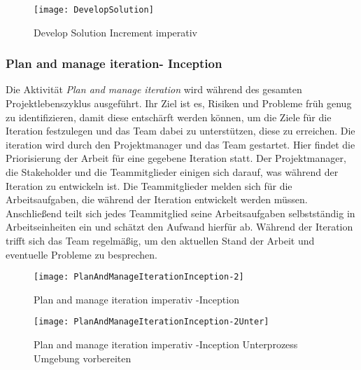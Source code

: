  
\begin{figure}[htp]
\begin{center}
  \texttt{[image: DevelopSolution]} %
  \caption{Develop Solution Increment imperativ}
  \label{fig:Develop}
\end{center}
\end{figure}

\subsubsection{Plan and manage iteration- Inception}

Die Aktivität \textit{Plan and manage iteration} wird während des gesamten Projektlebenszyklus ausgeführt. Ihr Ziel ist es, Risiken und Probleme früh genug zu identifizieren, damit diese entschärft werden können, um die Ziele für die Iteration festzulegen und das Team dabei zu unterstützen, diese zu erreichen.\newline
Die iteration wird durch den Projektmanager und das Team gestartet. Hier findet die Priorisierung der Arbeit für eine gegebene Iteration statt. Der Projektmanager, die Stakeholder und die Teammitglieder einigen sich darauf, was während der Iteration zu entwickeln ist.\newline
Die Teammitglieder melden sich für die Arbeitsaufgaben, die während der Iteration entwickelt werden müssen. Anschließend teilt sich jedes Teammitglied seine Arbeitsaufgaben selbstständig in Arbeitseinheiten ein und schätzt den Aufwand hierfür ab.\newline
Während der Iteration trifft sich das Team regelmäßig, um den aktuellen Stand der Arbeit und eventuelle Probleme zu besprechen.


\begin{figure}[!htbp]
\begin{center}
  \texttt{[image: PlanAndManageIterationInception-2]} %
  \caption{Plan and manage iteration imperativ -Inception}
  \label{fig:PlanAndManageIterationInception-2}
\end{center}
\end{figure}

\begin{figure}[!htbp]
\begin{center}
  \texttt{[image: PlanAndManageIterationInception-2Unter]} %
  \caption{Plan and manage iteration imperativ -Inception Unterprozess Umgebung vorbereiten} 
  \label{fig:PlanAndManageIterationInception-2}
\end{center}
\end{figure}


